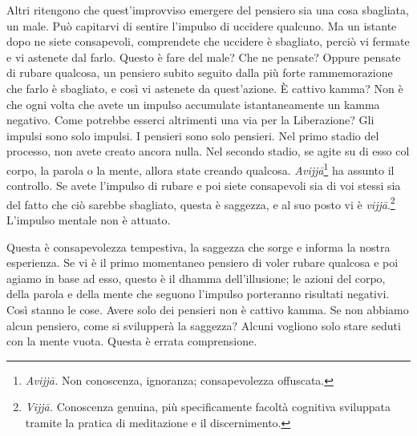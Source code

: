 Altri ritengono che quest'improvviso emergere del pensiero sia una cosa
sbagliata, un male. Può capitarvi di sentire l'impulso di uccidere
qualcuno. Ma un istante dopo ne siete consapevoli, comprendete che
uccidere è sbagliato, perciò vi fermate e vi astenete dal farlo. Questo
è fare del male? Che ne pensate? Oppure pensate di rubare qualcosa, un
pensiero subito seguito dalla più forte rammemorazione che farlo è
sbagliato, e così vi astenete da quest'azione. È cattivo kamma?
Non è che ogni volta che avete un impulso accumulate istantaneamente un
kamma negativo. Come potrebbe esserci altrimenti una via per la
Liberazione? Gli impulsi sono solo impulsi. I pensieri sono solo
pensieri. Nel primo stadio del processo, non avete creato ancora nulla.
Nel secondo stadio, se agite su di esso col corpo, la parola o la mente,
allora state creando qualcosa. \emph{Avijjā}\footnote{%
  \emph{Avijjā.} Non conoscenza, ignoranza; consapevolezza offuscata.}
ha assunto il
controllo. Se avete l'impulso di rubare e poi siete consapevoli sia di
voi stessi sia del fatto che ciò sarebbe sbagliato, questa è saggezza, e
al suo posto vi è \emph{vijjā}.\footnote{%
  \emph{Vijjā.} Conoscenza
  genuina, più specificamente facoltà cognitiva sviluppata tramite la
  pratica di meditazione e il discernimento.}
L'impulso mentale non è attuato.

Questa è consapevolezza tempestiva, la saggezza che sorge e informa la
nostra esperienza. Se vi è il primo momentaneo pensiero di voler rubare
qualcosa e poi agiamo in base ad esso, questo è il dhamma
dell'illusione; le azioni del corpo, della parola e della mente che
seguono l'impulso porteranno risultati negativi. Così stanno le cose.
Avere solo dei pensieri non è cattivo kamma. Se non abbiamo alcun
pensiero, come si svilupperà la saggezza? Alcuni vogliono solo stare
seduti con la mente vuota. Questa è errata comprensione.

